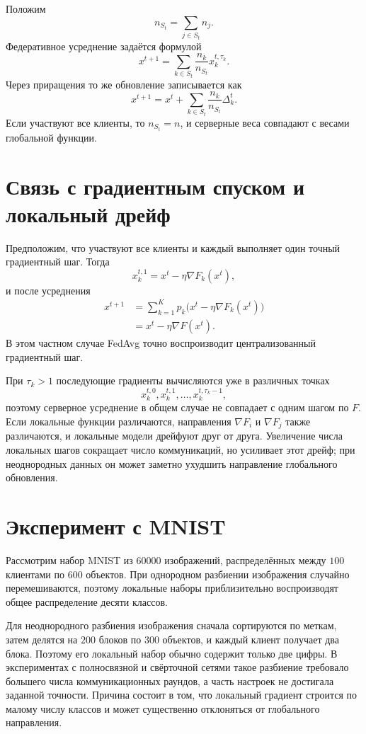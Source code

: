 Положим
\[
    n_{S_t}=\sum_{j\in S_t}n_j.
\]
Федеративное усреднение задаётся формулой
\[
    x^{t+1}
    =
    \sum_{k\in S_t}
    \frac{n_k}{n_{S_t}}x_k^{t,\tau_k}.
\]
Через приращения то же обновление записывается как
\[
    x^{t+1}
    =
    x^t
    +
    \sum_{k\in S_t}
    \frac{n_k}{n_{S_t}}\Delta_k^t.
\]
Если участвуют все клиенты, то \(n_{S_t}=n\), и серверные веса
совпадают с весами глобальной функции.

\section{Связь с градиентным спуском и локальный дрейф}

Предположим, что участвуют все клиенты и каждый выполняет один точный
градиентный шаг. Тогда
\[
    x_k^{t,1}
    =
    x^t-\eta\nabla F_k(x^t),
\]
и после усреднения
\[
\begin{aligned}
    x^{t+1}
    &=
    \sum_{k=1}^{K}p_k
    \bigl(x^t-\eta\nabla F_k(x^t)\bigr)
    \\
    &=
    x^t-\eta\nabla F(x^t).
\end{aligned}
\]
В этом частном случае FedAvg точно воспроизводит централизованный
градиентный шаг.

При \(\tau_k>1\) последующие градиенты вычисляются уже в различных
точках
\[
    x_k^{t,0},x_k^{t,1},\ldots,x_k^{t,\tau_k-1},
\]
поэтому серверное усреднение в общем случае не совпадает с одним
шагом по \(F\). Если локальные функции различаются, направления
\(\nabla F_i\) и \(\nabla F_j\) также различаются, и локальные модели
дрейфуют друг от друга. Увеличение числа локальных шагов сокращает
число коммуникаций, но усиливает этот дрейф; при неоднородных данных
он может заметно ухудшить направление глобального обновления.

\section{Эксперимент с MNIST}

Рассмотрим набор MNIST из \(60000\) изображений,
распределённых между \(100\) клиентами по \(600\) объектов. При
однородном разбиении изображения случайно перемешиваются, поэтому
локальные наборы приблизительно воспроизводят общее распределение
десяти классов.

Для неоднородного разбиения изображения сначала сортируются по меткам,
затем делятся на \(200\) блоков по \(300\) объектов, и каждый клиент
получает два блока. Поэтому его локальный набор обычно содержит только
две цифры. В экспериментах с полносвязной и свёрточной сетями такое
разбиение требовало большего числа коммуникационных раундов, а часть
настроек не достигала заданной точности. Причина состоит в том, что
локальный градиент строится по малому числу классов и может существенно
отклоняться от глобального направления.

